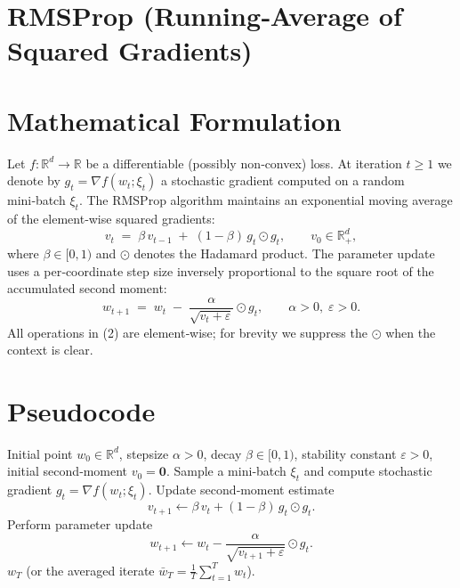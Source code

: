 \documentclass{article}
\newcommand{\R}{\mathbb{R}}
\begin{document}
\section*{RMSProp (Running‑Average of Squared Gradients)}

\section*{Mathematical Formulation}
Let $f:\R^d\rightarrow\R$ be a differentiable (possibly non‑convex) loss.  
At iteration $t\ge 1$ we denote by $g_t=\nabla f(w_t;\xi_t)$ a stochastic gradient
computed on a random mini‑batch $\xi_t$.  
The RMSProp algorithm maintains an exponential moving average of the element‑wise
squared gradients:
\[
\boxed{v_t \;=\; \beta\,v_{t-1} \;+\; (1-\beta)\,g_t\odot g_t},
\qquad v_0\in\R^d_{+},
\tag{1}
\]
where $\beta\in[0,1)$ and $\odot$ denotes the Hadamard product.  
The parameter update uses a per‑coordinate step size inversely proportional to
the square root of the accumulated second moment:
\[
\boxed{w_{t+1}\;=\; w_t \;-\; \frac{\alpha}{\sqrt{v_t+\varepsilon}}\odot g_t},
\qquad \alpha>0,\;\varepsilon>0.
\tag{2}
\]
All operations in (2) are element‑wise; for brevity we suppress the $\odot$ when
the context is clear.

\section*{Pseudocode}
\begin{algorithm}[H]
\caption{RMSProp}
\begin{algorithmic}[1]
\REQUIRE Initial point $w_0\in\R^d$, stepsize $\alpha>0$, decay $\beta\in[0,1)$,
stability constant $\varepsilon>0$, initial second‑moment $v_0=\mathbf{0}$.
    \STATE Sample a mini‑batch $\xi_t$ and compute stochastic gradient 
    $g_t=\nabla f(w_t;\xi_t)$.
    \STATE Update second‑moment estimate 
    \[
    v_{t+1}\gets \beta\,v_t+(1-\beta)\,g_t\odot g_t .
    \] 
    \STATE Perform parameter update 
    \[
    w_{t+1}\gets w_t-\frac{\alpha}{\sqrt{v_{t+1}+\varepsilon}}\odot g_t .
    \]
\ENDFOR
\RETURN $w_T$ (or the averaged iterate $\bar w_T=\frac1T\sum_{t=1}^T w_t$).
\end{algorithmic}
\end{algorithm}
\end{document}
